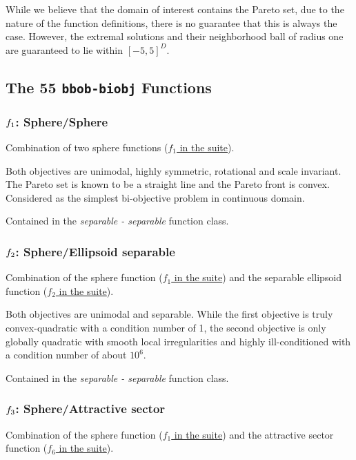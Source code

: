 \documentclass[letterpaper,12pt,english]{article}
\begin{document}
While we believe that the domain of interest contains the Pareto set,
due to the nature of the  function definitions, there is no
guarantee that this is always the case.
However, the extremal solutions and their neighborhood ball of radius one
are guaranteed to lie within \([-5,5]^D\).


\subsection{The 55 \texttt{bbob-biobj} Functions}
\label{index:the-55-bbob-biobj-functions}\label{index:coco-problem-get-smallest-value-of-interest}

\subsubsection{\protect\(f_1\protect\): Sphere/Sphere}
\label{index:f1}\label{index:sphere-sphere}
Combination of two sphere functions (\href{http://coco.lri.fr/downloads/download15.03/bbobdocfunctions.pdf\#page=5}{\(f_1\) in the  suite}).

Both objectives are unimodal, highly symmetric, rotational and scale
invariant. The Pareto set is known to be a straight line and the Pareto
front is convex. Considered as the simplest bi-objective problem in
continuous domain.

Contained in the \emph{separable - separable} function class.


\subsubsection{\protect\(f_2\protect\): Sphere/Ellipsoid separable}
\label{index:f2}\label{index:sphere-ellipsoid-separable}
Combination of the sphere function (\href{http://coco.lri.fr/downloads/download15.03/bbobdocfunctions.pdf\#page=5}{\(f_1\) in the  suite})
and the separable ellipsoid function (\href{http://coco.lri.fr/downloads/download15.03/bbobdocfunctions.pdf\#page=10}{\(f_2\) in the  suite}).

Both objectives are unimodal and separable. While the first objective is
truly convex-quadratic with a condition number of 1, the second
objective is only globally quadratic with smooth local
irregularities and highly ill-conditioned with a condition number of
about \(10^6\).

Contained in the \emph{separable - separable} function class.


\subsubsection{\protect\(f_3\protect\): Sphere/Attractive sector}
\label{index:f3}\label{index:sphere-attractive-sector}
Combination of the sphere function (\href{http://coco.lri.fr/downloads/download15.03/bbobdocfunctions.pdf\#page=5}{\(f_1\) in the  suite})
and the attractive sector function (\href{http://coco.lri.fr/downloads/download15.03/bbobdocfunctions.pdf\#page=30}{\(f_6\) in the  suite}).
\end{document}
